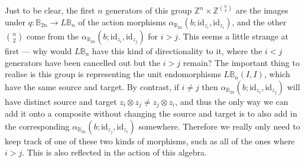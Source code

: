 \documentclass{amsbook} %
\newcommand{\id}{\textrm{id}}
\numberwithin{section}{chapter}
\begin{document}
Just to be clear, the first $n$ generators of this group $\mathbb{Z}^{n} \times \mathbb{Z}^{\binom{n}{2}}$ are the images under $q \colon \mathbb{B}_{2n} \rightarrow L\mathbb{B}_n$ of the action morphisms $\alpha_{\mathbb{B}_{2n}}(b;\id_{z_i},\id_{z_i})$, and the other $\binom{n}{2}$ come from the $\alpha_{\mathbb{B}_{2n}}(b;\id_{z_i},\id_{z_j})$ for $i > j$. This seems a little strange at first --- why would $L\mathbb{B}_n$ have this kind of directionality to it, where the $i<j$ generators have been cancelled out but the $i > j$ remain? The important thing to realise is this group is representing the unit endomorphisms $L\mathbb{B}_n(I,I)$, which have the same source and target. By contrast, if $i \neq j$ then $\alpha_{\mathbb{B}_{2n}}(b;\id_{z_i},\id_{z_j})$ will have distinct source and target $z_i \otimes z_j \neq z_j \otimes z_i$, and thus the only way we can add it onto a composite without changing the source and target is to also add in the corresponding $\alpha_{\mathbb{B}_{2n}}(b;\id_{z_j},\id_{z_i})$ somewhere. Therefore we really only need to keep track of one of these two kinds of morphisms, such as all of the ones where $i > j$. This is also reflected in the action of this algebra.
\end{document}
